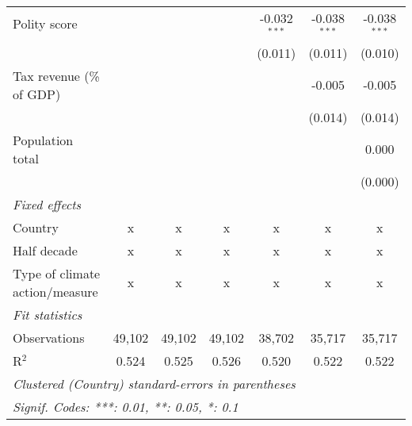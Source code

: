 \begin{tabular}{lcccccc}
   Polity score                                                            &         &               &               & -0.032$^{***}$ & -0.038$^{***}$ & -0.038$^{***}$\\   
                                                                           &         &               &               & (0.011)        & (0.011)        & (0.010)\\   
   Tax revenue (\% of GDP)                                                 &         &               &               &                & -0.005         & -0.005\\   
                                                                           &         &               &               &                & (0.014)        & (0.014)\\   
   Population total                                                        &         &               &               &                &                & 0.000\\   
                                                                           &         &               &               &                &                & (0.000)\\   
   \emph{Fixed effects}\\
   Country                                                                 & x       & x             & x             & x              & x              & x\\  
   Half decade                                                             & x       & x             & x             & x              & x              & x\\  
   Type of climate action/measure                                          & x       & x             & x             & x              & x              & x\\  
   \midrule \emph{Fit statistics}\\
   Observations                                                            & 49,102  & 49,102        & 49,102        & 38,702         & 35,717         & 35,717\\  
   R$^2$                                                                   & 0.524   & 0.525         & 0.526         & 0.520          & 0.522          & 0.522\\  
   \midrule
   \multicolumn{7}{l}{\emph{Clustered (Country) standard-errors in parentheses}}\\
   \multicolumn{7}{l}{\emph{Signif. Codes: ***: 0.01, **: 0.05, *: 0.1}}\\
\end{tabular}
\par\endgroup


